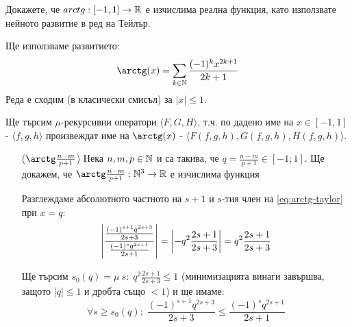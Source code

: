 \begin{problem}
Докажете, че $arctg : [-1, 1] \to {\mathbb{R}}$ е изчислима реална функция, като използвате нейното развитие в ред на Тейлър.
\end{problem}
\begin{solution}
    Ще използваме развитието:
    \begin{equation}\label{eq:arctg-taylor}
        \arctg(x) = \sum_{k\in\N} \frac{(-1)^k x^{2k+1}}{2k+1}
    \end{equation}
    Реда е сходим (в класически смисъл) за $|x| \leq 1$.

    Ще търсим $\mu$-рекурсивни оператори $\langle F, G, H \rangle$, т.ч. по дадено име на $x \in [-1, 1]$ - $\langle f, g, h\rangle$ произвеждат име на $\arctg(x)$ - $\langle F(f, g, h), G(f, g, h), H(f, g, h)\rangle$.

    \begin{itemize}
        \item[($\arctg\frac{n - m}{p+1}$)] Нека $n,m,p \in {\mathbb{N}}$ и са такива, че $q = \frac{n - m}{p+1} \in [-1; 1]$. Ще докажем, че $\arctg\frac{n - m}{p+1} : \N^3 \to \R$ е изчислима функция

              Разглеждаме абсолютното частното на $s+1$ и $s$-тия член на \eqref{eq:arctg-taylor} при $x = q$:
              \begin{equation}
                  \left|\frac{\frac{(-1)^{s+1} q^{2s+3}}{2s+3}}{\frac{(-1)^s q^{2s+1}}{2s+1}}\right| = \left|- q^2 \frac{2s+1}{2s + 3}\right| = q^2 \frac{2s+1}{2s + 3}
              \end{equation}

              Ще търсим $s_0(q) = \mu\ s:\; q^2 \frac{2s+1}{2s+3} \leq 1$ (минимизацията винаги завършва, защото $|q| \leq 1$ и дробта също $<1$) и ще имаме:
              \begin{equation}
                  \forall s \geq s_0(q):\; \frac{(-1)^{s+1} q^{2s+3}}{2s+3} \leq \frac{(-1)^s q^{2s+1}}{2s+1}
              \end{equation}


\end{itemize}
\end{solution}
